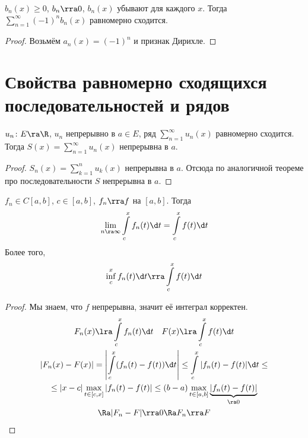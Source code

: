 \begin{theorem}
	$b_n(x) \ge 0$, $b_n \rra 0$, $b_n(x)$ убывают для каждого $x$.
	Тогда $\sum_{n=1}^\infty (-1)^n b_n(x)$ равномерно сходится.
\end{theorem}
\begin{proof}
	Возьмём $a_n(x) = (-1)^n$ и признак Дирихле.
\end{proof}

\section[Св-ва равномерно сход-ся посл-тей и рядов]{Свойства равномерно сходящихся последовательностей и рядов}

\begin{theorem}
	$u_n\colon E \ra \R$, $u_n$ непрерывно в $a \in E$, ряд $\sum_{n=1}^\infty u_n(x)$ равномерно сходится.
	Тогда $S(x) = \sum_{n=1}^\infty u_n(x)$ непрерывна в $a$.
\end{theorem}
\begin{proof}
	$S_n(x) = \sum_{k=1}^n u_k(x)$ непрерывна в $a$.
	Отсюда по аналогичной теореме про последовательности $S$ непрерывна в $a$.
\end{proof}

\begin{theorem}
	$f_n \in C[a,b]$, $c \in [a,b]$, $f_n \rra f$ на $[a, b]$.
	Тогда
	\[ \lim_{n \ra \infty} \int\limits_c^x f_n(t) \d t = \int\limits_c^x f(t) \d t \]
	Более того,
	\[ \inf\limits_c^x f_n(t) \d t \rra \int\limits_c^x f(t) \d t \]
\end{theorem}
\begin{proof}
	Мы знаем, что $f$ непрерывна, значит её интеграл корректен.
	\begin{gather*}
		F_n(x) \lra \int\limits_c^x f_n(t) \d t \quad F(x) \lra \int\limits_c^x f(t) \d t \\
		\left| F_n(x) - F(x) \right|
		= \left| \int\limits_c^x (f_n(t) - f(t)) \d t \right|
		\le \int\limits_c^x |f_n(t) - f(t)| \d t \le \\
		\le |x - c| \max_{t \in [c,x]} |f_n(t) - f(t)|
		\le (b - a) \max_{t \in [a,b]} \underbrace{|f_n(t) - f(t)|}_{\ra 0} \\
		\Ra |F_n - F| \rra 0
		\Ra F_n \rra F
	\end{gather*}
\end{proof}

